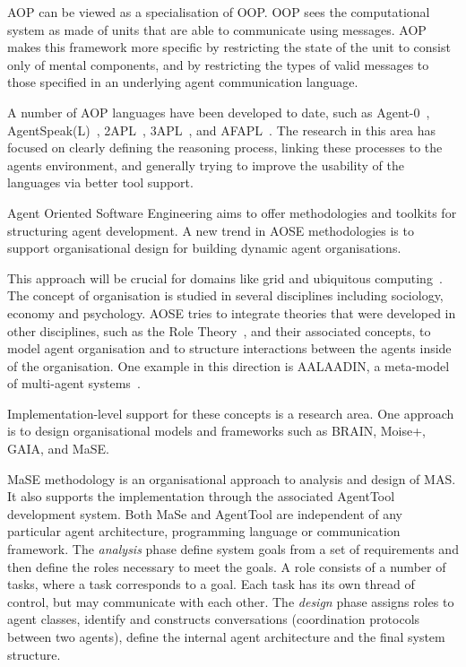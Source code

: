 \documentclass[a4paper,12pt,oneside]{book} %
\theoremstyle{remark}
\theoremstyle{plain}
\begin{document}
AOP can be viewed as a specialisation of OOP\null. OOP sees the
computational system as made of units that are able to communicate using
messages. AOP makes this framework more specific by restricting the state
of the unit to consist only of mental components, and by restricting the
types of valid messages to those specified in an underlying agent
communication language.

A number of AOP languages have been developed to date, such as
Agent-0~\cite{DBLP:journals/ai/Shoham93},
AgentSpeak(L)~\cite{DBLP:conf/maamaw/Rao96},
2APL~\cite{DBLP:journals/aamas/Dastani08},
3APL~\cite{DBLP:conf/promas/DastaniRDM03}, and
AFAPL~\cite{DBLP:conf/seke/CollierOR04}. The research in this area has focused
on clearly defining the reasoning process, linking these processes to the
agents environment, and generally trying to improve the usability of the
languages via better tool support.

Agent Oriented Software Engineering aims to offer methodologies and toolkits
for structuring agent development. A new trend in AOSE methodologies is to support organisational design for building dynamic agent organisations.

This approach will be crucial for domains like grid and ubiquitous
computing~\cite{luck2005agent}. The concept of organisation is studied in
several disciplines including sociology, economy and psychology. AOSE tries to
integrate theories that were developed in other disciplines, such as the Role
Theory~\cite{biddle1986recent}, and their associated concepts, to model agent
organisation and to structure interactions between the agents inside of the
organisation. One example in this direction is AALAADIN, a meta-model of
multi-agent systems~\cite{ferber1998meta}.

Implementation-level support for these concepts is a research area. One
approach is to design organisational models and frameworks such as BRAIN, Moise+, GAIA, and MaSE.

MaSE methodology \cite{deloach2004mase} is an organisational approach to
analysis and design of MAS. It also supports the implementation through the
associated AgentTool development system. Both MaSe and AgentTool are
independent of any particular agent architecture, programming language or
communication framework. The \emph{analysis} phase define system goals from
a set of requirements and then define the roles necessary to meet the
goals. A role consists of a number of tasks, where a task corresponds to a
goal. Each task has its own thread of control, but may communicate with
each other. The \emph{design} phase assigns roles to agent classes,
identify and constructs conversations (coordination protocols between two
agents), define the internal agent architecture and the final system
structure.
\end{document}
